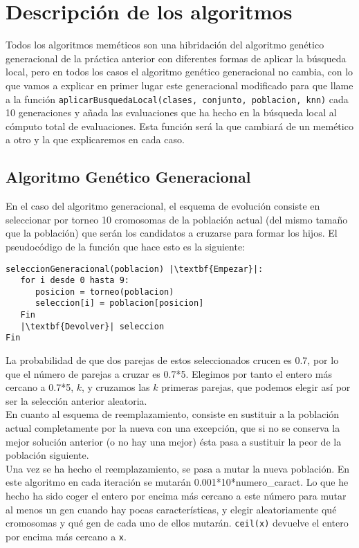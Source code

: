 \documentclass[12pt]{article}
\begin{document}
\newpage

\section{Descripción de los algoritmos}
Todos los algoritmos meméticos son una hibridación del algoritmo genético generacional de la práctica anterior con diferentes formas de aplicar la búsqueda local, pero en todos los casos el algoritmo genético generacional no cambia, con lo que vamos a explicar en primer lugar este generacional modificado para que llame a la función \texttt{aplicarBusquedaLocal(clases, conjunto, poblacion, knn)} cada 10 generaciones y añada las evaluaciones que ha hecho en la búsqueda local al cómputo total de evaluaciones. Esta función será la que cambiará de un memético a otro y la que explicaremos en cada caso.

\subsection{Algoritmo Genético Generacional}
En el caso del algoritmo generacional, el esquema de evolución consiste en seleccionar por torneo 10 cromosomas de la población actual (del mismo tamaño que la población) que serán los candidatos a cruzarse para formar los hijos. El pseudocódigo de la función que hace esto es la siguiente:
\begin{lstlisting}
seleccionGeneracional(poblacion) |\textbf{Empezar}|:
   for i desde 0 hasta 9:
      posicion = torneo(poblacion)
      seleccion[i] = poblacion[posicion]
   Fin
   |\textbf{Devolver}| seleccion
Fin
\end{lstlisting}

La probabilidad de que dos parejas de estos seleccionados crucen es 0.7, por lo que el número de parejas a cruzar es 0.7*5. Elegimos por tanto el entero más cercano a 0.7*5, $k$, y cruzamos las $k$ primeras parejas, que podemos elegir así por ser la selección anterior aleatoria.\\

En cuanto al esquema de reemplazamiento, consiste en sustituir a la población actual completamente por la nueva con una excepción, que si no se conserva la mejor solución anterior (o no hay una mejor) ésta pasa a sustituir la peor de la población siguiente.\\
Una vez se ha hecho el reemplazamiento, se pasa a mutar la nueva población. En este algoritmo en cada iteración se mutarán 0.001*10*numero\_caract. Lo que he hecho ha sido coger el entero por encima más cercano a este número para mutar al menos un gen cuando hay pocas características, y elegir aleatoriamente qué cromosomas y qué gen de cada uno de ellos mutarán. \texttt{ceil(x)} devuelve el entero por encima más cercano a \texttt{x}.\\
\end{document}
